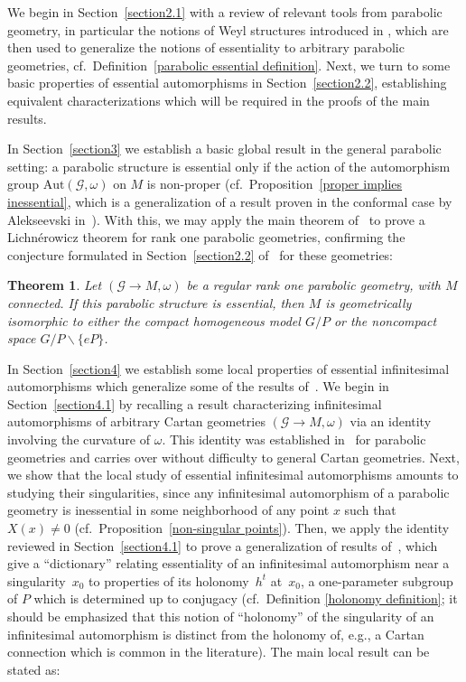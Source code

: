 \documentclass[pdftex]{sigma}
\def\Gbdle{\mathcal{G}}
\theoremstyle{plain}
\newtheorem{Theorem}{Theorem}[section]
\theoremstyle{definition}
\begin{document}
We begin in Section~\ref{section2.1} with a review of relevant tools from parabolic geometry, in particular the notions of Weyl structures introduced in \cite{CS03}, which are then used to generalize the notions of essentiality to arbitrary parabolic geometries, cf.\ Def\/inition~\ref{parabolic essential definition}. Next, we turn to some basic properties of essential automorphisms in Section~\ref{section2.2}, establishing equivalent characterizations which will be required in the proofs of the main results.

In Section~\ref{section3} we establish a basic global result in the general parabolic setting: a parabolic structure is essential only if the action of the automorphism group $\mathrm{Aut}(\Gbdle,\omega)$ on $M$ is non-proper (cf.\ Proposition~\ref{proper implies inessential}, which is a generalization of a result proven in the conformal case by Alekseevski in~\cite{Aleks}). With this, we may apply the main theorem of~\cite{Frances} to prove a Lichn\'{e}rowicz theorem for rank one parabolic geometries, conf\/irming the conjecture formulated in Section~\ref{section2.2} of~\cite{FrEss} for these geometries:

\begin{Theorem} \label{Lich for rank one parabolic} Let $(\Gbdle \rightarrow M,\omega)$ be a regular rank one parabolic geometry, with $M$ connected. If this parabolic structure is essential, then $M$ is geometrically isomorphic to either the compact homogeneous model $G/P$ or the noncompact space $G/P \backslash \{eP\}$.
\end{Theorem}

In Section~\ref{section4} we establish some local properties of essential inf\/initesimal automorphisms which generalize some of the results of~\cite{Frances3}. We begin in Section~\ref{section4.1} by recalling a result characterizing inf\/initesimal automorphisms of arbitrary Cartan geometries $(\Gbdle \rightarrow M,\omega)$ via an identity involving the curvature of $\omega$. This identity was established in~\cite{Cap inf aut} for parabolic geometries and carries over without dif\/f\/iculty to general Cartan geometries. Next, we show that the local study of essential inf\/initesimal automorphisms amounts to studying their singularities, since any inf\/initesimal automorphism of a parabolic geometry is inessential in some neighborhood of any point $x$ such that $X(x) \neq 0$ (cf.\ Proposition~\ref{non-singular points}). Then, we apply the identity reviewed in Section~\ref{section4.1} to prove a generalization of results of~\cite{Frances3}, which give a ``dictionary'' relating essentiality of an inf\/initesimal automorphism near a singularity~$x_0$ to properties of its holonomy~$h^t$ at~$x_0$, a one-parameter subgroup of $P$ which is determined up to conjugacy (cf.\ Def\/inition \ref{holonomy definition}; it should be emphasized that this notion of ``holonomy'' of the singularity of an inf\/initesimal automorphism is distinct from the holonomy of, e.g., a Cartan connection which is common in the literature). The main local result can be stated as:
\end{document}
